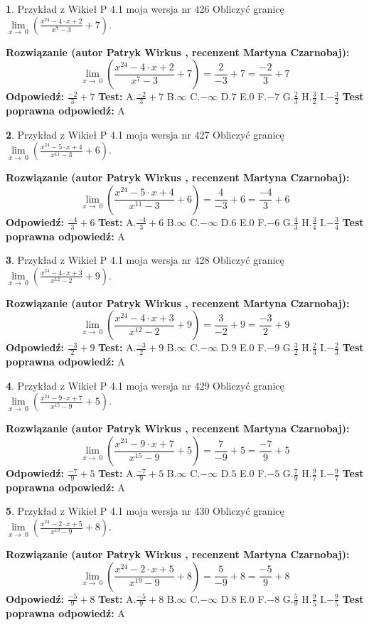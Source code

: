\documentclass[12pt, a4paper]{article}
\theoremstyle{definition} %
\newtheorem{zad}{}
\newcommand{\zadStart}[1]{\begin{zad}#1\newline}
\newcommand{\zadStop}{\end{zad}}
\newcommand{\rozwStart}[2]{\noindent \textbf{Rozwiązanie (autor #1 , recenzent #2): }\newline}
\newcommand{\rozwStop}{\newline}
\newcommand{\odpStart}{\noindent \textbf{Odpowiedź:}\newline}
\newcommand{\odpStop}{\newline}
\newcommand{\testStart}{\noindent \textbf{Test:}\newline}
\newcommand{\testStop}{\newline}
\newcommand{\kluczStart}{\noindent \textbf{Test poprawna odpowiedź:}\newline}
\newcommand{\kluczStop}{\newline}
\begin{document}
\zadStart{Przykład z Wikieł P 4.1 moja wersja nr 426}
Obliczyć granicę $\lim\limits_{x\to\ 0}(\frac{x^{24}-4 \cdot x +2}{x^{7}-3}+7)$.
\zadStop
\rozwStart{Patryk Wirkus}{Martyna Czarnobaj}
$$\lim\limits_{x\to\ 0}(\frac{x^{24}-4 \cdot x +2}{x^{7}-3}+7)=\frac{2}{-3}+7=\frac{-2}{3}+7$$
\rozwStop
\odpStart
$\frac{-2}{3}+7$
\odpStop
\testStart
A.$\frac{-2}{3}+7$
B.$\infty$
C.$-\infty$
D.$7$
E.$0$
F.$-7$
G.$\frac{2}{3}$
H.$\frac{3}{2}$
I.$-\frac{3}{2}$
\testStop
\kluczStart
A
\kluczStop



\zadStart{Przykład z Wikieł P 4.1 moja wersja nr 427}
Obliczyć granicę $\lim\limits_{x\to\ 0}(\frac{x^{24}-5 \cdot x +4}{x^{11}-3}+6)$.
\zadStop
\rozwStart{Patryk Wirkus}{Martyna Czarnobaj}
$$\lim\limits_{x\to\ 0}(\frac{x^{24}-5 \cdot x +4}{x^{11}-3}+6)=\frac{4}{-3}+6=\frac{-4}{3}+6$$
\rozwStop
\odpStart
$\frac{-4}{3}+6$
\odpStop
\testStart
A.$\frac{-4}{3}+6$
B.$\infty$
C.$-\infty$
D.$6$
E.$0$
F.$-6$
G.$\frac{4}{3}$
H.$\frac{3}{4}$
I.$-\frac{3}{4}$
\testStop
\kluczStart
A
\kluczStop



\zadStart{Przykład z Wikieł P 4.1 moja wersja nr 428}
Obliczyć granicę $\lim\limits_{x\to\ 0}(\frac{x^{24}-4 \cdot x +3}{x^{12}-2}+9)$.
\zadStop
\rozwStart{Patryk Wirkus}{Martyna Czarnobaj}
$$\lim\limits_{x\to\ 0}(\frac{x^{24}-4 \cdot x +3}{x^{12}-2}+9)=\frac{3}{-2}+9=\frac{-3}{2}+9$$
\rozwStop
\odpStart
$\frac{-3}{2}+9$
\odpStop
\testStart
A.$\frac{-3}{2}+9$
B.$\infty$
C.$-\infty$
D.$9$
E.$0$
F.$-9$
G.$\frac{3}{2}$
H.$\frac{2}{3}$
I.$-\frac{2}{3}$
\testStop
\kluczStart
A
\kluczStop



\zadStart{Przykład z Wikieł P 4.1 moja wersja nr 429}
Obliczyć granicę $\lim\limits_{x\to\ 0}(\frac{x^{24}-9 \cdot x +7}{x^{15}-9}+5)$.
\zadStop
\rozwStart{Patryk Wirkus}{Martyna Czarnobaj}
$$\lim\limits_{x\to\ 0}(\frac{x^{24}-9 \cdot x +7}{x^{15}-9}+5)=\frac{7}{-9}+5=\frac{-7}{9}+5$$
\rozwStop
\odpStart
$\frac{-7}{9}+5$
\odpStop
\testStart
A.$\frac{-7}{9}+5$
B.$\infty$
C.$-\infty$
D.$5$
E.$0$
F.$-5$
G.$\frac{7}{9}$
H.$\frac{9}{7}$
I.$-\frac{9}{7}$
\testStop
\kluczStart
A
\kluczStop



\zadStart{Przykład z Wikieł P 4.1 moja wersja nr 430}
Obliczyć granicę $\lim\limits_{x\to\ 0}(\frac{x^{24}-2 \cdot x +5}{x^{19}-9}+8)$.
\zadStop
\rozwStart{Patryk Wirkus}{Martyna Czarnobaj}
$$\lim\limits_{x\to\ 0}(\frac{x^{24}-2 \cdot x +5}{x^{19}-9}+8)=\frac{5}{-9}+8=\frac{-5}{9}+8$$
\rozwStop
\odpStart
$\frac{-5}{9}+8$
\odpStop
\testStart
A.$\frac{-5}{9}+8$
B.$\infty$
C.$-\infty$
D.$8$
E.$0$
F.$-8$
G.$\frac{5}{9}$
H.$\frac{9}{5}$
I.$-\frac{9}{5}$
\testStop
\kluczStart
A
\kluczStop
\end{document}

